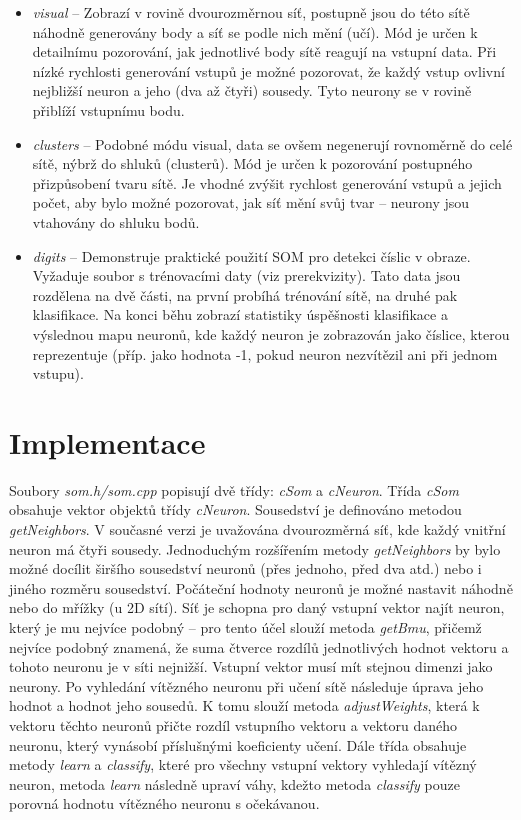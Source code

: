 \documentclass[11pt]{article}
\begin{document}
\begin{itemize}
	\item \textit{visual} -- Zobrazí v rovině dvourozměrnou síť, postupně jsou do této sítě náhodně generovány body a síť se podle nich mění (učí). Mód je určen k detailnímu pozorování, jak jednotlivé body sítě reagují na vstupní data. Při nízké rychlosti generování vstupů je možné pozorovat, že každý vstup ovlivní nejbližší neuron a jeho (dva až čtyři) sousedy. Tyto neurony se v rovině přiblíží vstupnímu bodu.
	\item \textit{clusters} -- Podobné módu visual, data se ovšem negenerují rovnoměrně do celé sítě, nýbrž do shluků (clusterů). Mód je určen k pozorování postupného přizpůsobení tvaru sítě. Je vhodné zvýšit rychlost generování vstupů a jejich počet, aby bylo možné pozorovat, jak síť mění svůj tvar -- neurony jsou vtahovány do shluku bodů.
	\item \textit{digits} -- Demonstruje praktické použití SOM pro detekci číslic v obraze. Vyžaduje soubor s trénovacími daty (viz prerekvizity). Tato data jsou rozdělena na dvě části, na první probíhá trénování sítě, na druhé pak klasifikace. Na konci běhu zobrazí statistiky úspěšnosti klasifikace a výslednou mapu neuronů, kde každý neuron je zobrazován jako číslice, kterou reprezentuje (příp. jako hodnota -1, pokud neuron nezvítězil ani při jednom vstupu).
\end{itemize}


\section*{Implementace}
Soubory \textit{som.h/som.cpp} popisují dvě třídy: \textit{cSom} a \textit{cNeuron}. Třída \textit{cSom} obsahuje vektor objektů třídy \textit{cNeuron}. Sousedství je definováno metodou \textit{getNeighbors}. V současné verzi je uvažována dvourozměrná síť, kde každý vnitřní neuron má čtyři sousedy. Jednoduchým rozšířením metody \textit{getNeighbors} by bylo možné docílit širšího sousedství neuronů (přes jednoho, před dva atd.) nebo i jiného rozměru sousedství. Počáteční hodnoty neuronů je možné nastavit náhodně nebo do mřížky (u 2D sítí). Síť je schopna pro daný vstupní vektor najít neuron, který je mu nejvíce podobný -- pro tento účel slouží metoda \textit{getBmu}, přičemž nejvíce podobný znamená, že suma čtverce rozdílů jednotlivých hodnot vektoru a tohoto neuronu je v síti nejnižší. Vstupní vektor musí mít stejnou dimenzi jako neurony. Po vyhledání vítězného neuronu při učení sítě následuje úprava jeho hodnot a hodnot jeho sousedů. K tomu slouží metoda \textit{adjustWeights}, která k vektoru těchto neuronů přičte rozdíl vstupního vektoru a vektoru daného neuronu, který vynásobí příslušnými koeficienty učení. Dále třída obsahuje metody \textit{learn} a \textit{classify}, které pro všechny vstupní vektory vyhledají vítězný neuron, metoda \textit{learn} následně upraví váhy, kdežto metoda \textit{classify} pouze porovná hodnotu vítězného neuronu s očekávanou.
\end{document}
